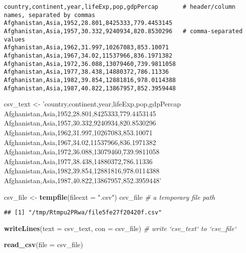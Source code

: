 \documentclass[
]{book}
\newenvironment{Shaded}{\begin{snugshade}}{\end{snugshade}}
\newcommand{\CommentTok}[1]{\textcolor[rgb]{0.56,0.35,0.01}{\textit{#1}}}
\newcommand{\DataTypeTok}[1]{\textcolor[rgb]{0.13,0.29,0.53}{#1}}
\newcommand{\KeywordTok}[1]{\textcolor[rgb]{0.13,0.29,0.53}{\textbf{#1}}}
\newcommand{\NormalTok}[1]{#1}
\newcommand{\StringTok}[1]{\textcolor[rgb]{0.31,0.60,0.02}{#1}}
\begin{document}
\begin{verbatim}
country,continent,year,lifeExp,pop,gdpPercap       # header/column names, separated by commas
Afghanistan,Asia,1952,28.801,8425333,779.4453145
Afghanistan,Asia,1957,30.332,9240934,820.8530296   # comma-separated values
Afghanistan,Asia,1962,31.997,10267083,853.10071
Afghanistan,Asia,1967,34.02,11537966,836.1971382
Afghanistan,Asia,1972,36.088,13079460,739.9811058
Afghanistan,Asia,1977,38.438,14880372,786.11336
Afghanistan,Asia,1982,39.854,12881816,978.0114388
Afghanistan,Asia,1987,40.822,13867957,852.3959448
\end{verbatim}

\begin{Shaded}
\begin{Highlighting}[]
\NormalTok{csv_text <-}\StringTok{ }
\StringTok{'country,continent,year,lifeExp,pop,gdpPercap     }
\StringTok{Afghanistan,Asia,1952,28.801,8425333,779.4453145}
\StringTok{Afghanistan,Asia,1957,30.332,9240934,820.8530296}
\StringTok{Afghanistan,Asia,1962,31.997,10267083,853.10071}
\StringTok{Afghanistan,Asia,1967,34.02,11537966,836.1971382}
\StringTok{Afghanistan,Asia,1972,36.088,13079460,739.9811058}
\StringTok{Afghanistan,Asia,1977,38.438,14880372,786.11336}
\StringTok{Afghanistan,Asia,1982,39.854,12881816,978.0114388}
\StringTok{Afghanistan,Asia,1987,40.822,13867957,852.3959448'}

\NormalTok{csv_file <-}\StringTok{ }\KeywordTok{tempfile}\NormalTok{(}\DataTypeTok{fileext =} \StringTok{".csv"}\NormalTok{)      }
\NormalTok{csv_file }\CommentTok{# a temporary file path}
\end{Highlighting}
\end{Shaded}

\begin{verbatim}
## [1] "/tmp/Rtmpu2PRwa/file5fe27f20420f.csv"
\end{verbatim}

\begin{Shaded}
\begin{Highlighting}[]
\KeywordTok{writeLines}\NormalTok{(}\DataTypeTok{text =}\NormalTok{ csv_text, }\DataTypeTok{con =}\NormalTok{ csv_file) }\CommentTok{# write `csv_text` to `csv_file`}
\end{Highlighting}
\end{Shaded}

\begin{Shaded}
\begin{Highlighting}[]
\KeywordTok{read_csv}\NormalTok{(}\DataTypeTok{file =}\NormalTok{ csv_file)}
\end{Highlighting}
\end{Shaded}
\end{document}
